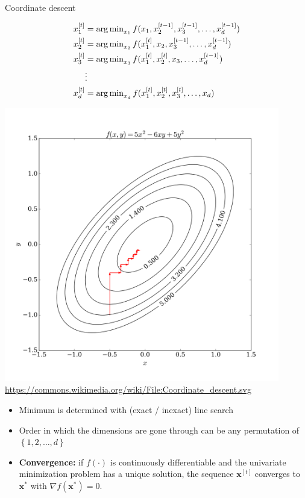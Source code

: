\documentclass[11pt,compress,t,notes=noshow, xcolor=table]{beamer}
\begin{document}
\begin{vbframe}{Coordinate descent}
\begin{minipage}{0.4\textwidth}
    \begin{scriptsize}
\begin{align*}
x^{[t]}_1 &= \operatorname{arg\,min}_{x_1} f(x_1, x^{[t-1]}_2, x^{[t-1]}_3, \hdots, x^{[t-1]}_d) \\
x^{[t]}_2 &= \operatorname{arg\,min}_{x_2} f(x^{[t]}_1, x_2, x^{[t-1]}_3, \hdots, x^{[t-1]}_d) \\
x^{[t]}_3 &= \operatorname{arg\,min}_{x_3} f(x^{[t]}_1, x^{[t]}_2, x_3, \hdots, x^{[t-1]}_d) \\
&\vdots \\
x^{[t]}_d &= \operatorname{arg\,min}_{x_d} f(x^{[t]}_1, x^{[t]}_2, x^{[t]}_3, \hdots, x_d) \\
\end{align*}
\end{scriptsize}
\end{minipage}
\begin{minipage}{0.52\textwidth}
\begin{center}
\includegraphics[width=0.9\textwidth]{figure_man/Coordinate_descent.png} \\
\tiny{\url{https://commons.wikimedia.org/wiki/File:Coordinate_descent.svg}}
\end{center}
\end{minipage}


\framebreak

\begin{itemize}
\item Minimum is determined with (exact / inexact) line search
\item Order in which the dimensions are gone through can be any permutation of $\left\{1,2,\hdots,d\right\}$
\item \textbf{Convergence:} if $f(\cdot)$ is continuously differentiable and the univariate minimization problem has a unique
solution, the sequence $\bm{x}^{[t]}$ converges to $\bm{x}^{*}$ with $\nabla f(\bm{x}^*) = 0$.


\end{itemize}
\end{vbframe}
\end{document}
